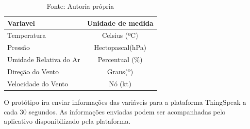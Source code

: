 \begin{table}[!ht]
\centering
\begin{tabular}{|l|c|}
\hline
\textbf{Variavel}      & \textbf{Unidade de medida} \\ \hline
Temperatura            & Celsius (ºC)               \\ \hline
Pressão                & Hectopascal(hPa)           \\ \hline
Umidade Relativa do Ar & Percentual (\%)            \\ \hline
Direção do Vento       & Graus(º)                   \\ \hline
Velocidade do Vento    & Nó (kt)                    \\ \hline
\end{tabular}
\caption{Fonte: Autoria própria}
\label{tab:unidades_medidas}
\end{table}

O protótipo ira enviar informações das variáveis para a plataforma ThingSpeak a cada 30 segundos. As informações enviadas  podem ser acompanhadas pelo aplicativo disponibilizado pela plataforma. 

